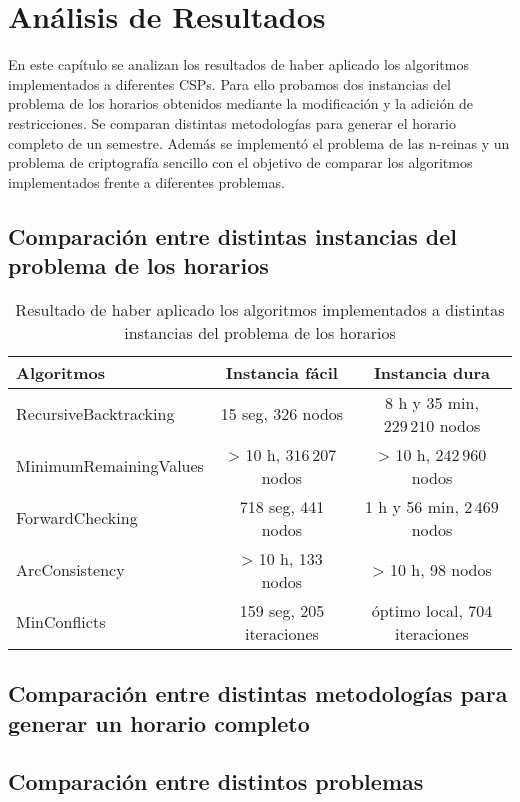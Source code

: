 \chapter{An\'alisis de Resultados}

En este cap\'itulo se analizan los resultados de haber aplicado los algoritmos implementados a diferentes CSPs. Para ello probamos dos instancias del problema de los horarios obtenidos mediante la modificaci\'on y la adici\'on de restricciones. Se comparan distintas metodolog\'ias para generar el horario completo de un semestre. Adem\'as se implement\'o el problema de las n-reinas y un problema de criptograf\'ia sencillo con el objetivo de comparar los algoritmos implementados frente a diferentes problemas.

\section{Comparaci\'on entre distintas instancias del problema de los horarios}

\begin{table}[h]
	\caption{Resultado de haber aplicado los algoritmos implementados a distintas instancias del problema de los horarios}
	\begin{center}
		\label{1semana}
		\begin{tabular}{l|c|c}
			Algoritmos & Instancia f\'acil & Instancia dura \\ \hline
			RecursiveBacktracking & 15 seg, 326 nodos & 8 h y 35 min, $229\,210$ nodos\\
			MinimumRemainingValues & > 10 h, $316\,207$ nodos &  > 10 h, $242\,960$ nodos\\
			ForwardChecking & 718 seg, 441 nodos & 1 h y 56 min, $2\,469$ nodos \\
			ArcConsistency & > 10 h, 133 nodos &  > 10 h, 98 nodos \\
			MinConflicts & 159 seg, 205 iteraciones & \'optimo local, 704 iteraciones
		\end{tabular}
	\end{center}
\end{table}

\section{Comparaci\'on entre distintas metodolog\'ias para generar un horario completo}

\section{Comparaci\'on entre distintos problemas}